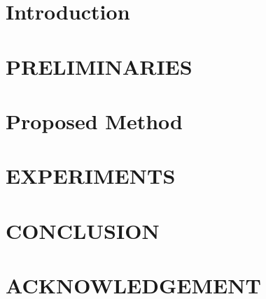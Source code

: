 \documentclass[10pt]{jarticle}
\begin{document}
\maketitle



\section{Introduction}\label{sec:Introduction}



\section{PRELIMINARIES}\label{sec:Preliminaries}


\section{Proposed Method}\label{sec:ProposedMethod}



\section{EXPERIMENTS}\label{sec:Experiments}


\section{CONCLUSION}\label{sec:Conclusion}


\section{ACKNOWLEDGEMENT}\label{sec:Acknowledgement}


\clearpage

\begin{spacing}{0.85}
    
    \small
    \setlength{\itemsep}{0pt}
    
\end{spacing}

\end{document}
